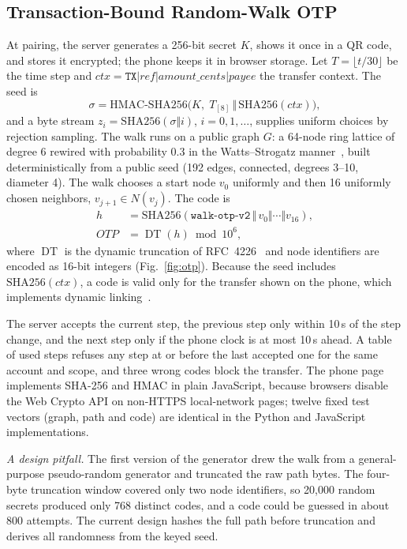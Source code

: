 \documentclass{ieeeaccess}
\begin{document}
\subsection{Transaction-Bound Random-Walk OTP}
\label{sec:otp}
At pairing, the server generates a 256-bit secret $K$, shows it once in a QR code, and stores it
encrypted; the phone keeps it in browser storage. Let $T=\lfloor t/30\rfloor$ be the time step and
$\mathit{ctx}=\texttt{TX}|\mathit{ref}|\mathit{amount\_cents}|\mathit{payee}$ the transfer context. The
seed is
\begin{equation}
\sigma=\text{HMAC-SHA256}\big(K,\;T_{[8]}\,\Vert\,\text{SHA256}(\mathit{ctx})\big),
\end{equation}
and a byte stream $z_i=\text{SHA256}(\sigma\Vert i)$, $i=0,1,\dots$, supplies uniform choices by
rejection sampling. The walk runs on a public graph $G$: a 64-node ring lattice of degree 6 rewired with
probability 0.3 in the Watts--Strogatz manner~\cite{watts1998}, built deterministically from a public
seed (192 edges, connected, degrees 3--10, diameter 4). The walk chooses a start node $v_0$ uniformly
and then 16 uniformly chosen neighbors, $v_{j+1}\in N(v_j)$. The code is
\begin{equation}
\begin{split}
h&=\text{SHA256}(\texttt{walk-otp-v2}\,\Vert\,v_0\Vert\cdots\Vert v_{16}),\\
\mathit{OTP}&=\operatorname{DT}(h)\bmod 10^6,
\end{split}
\end{equation}
where $\operatorname{DT}$ is the dynamic truncation of RFC~4226~\cite{rfc4226} and node identifiers are
encoded as 16-bit integers (Fig.~\ref{fig:otp}). Because the seed includes $\mathrm{SHA256}(\mathit{ctx})$,
a code is valid only for the transfer shown on the phone, which implements dynamic
linking~\cite{psd2rts}.

The server accepts the current step, the previous step only within 10\,s of the step change, and the
next step only if the phone clock is at most 10\,s ahead. A table of used steps refuses any step at or
before the last accepted one for the same account and scope, and three wrong codes block the transfer.
The phone page implements SHA-256 and HMAC in plain JavaScript, because browsers disable the Web Crypto
API on non-HTTPS local-network pages; twelve fixed test vectors (graph, path and code) are identical in
the Python and JavaScript implementations.

\emph{A design pitfall.} The first version of the generator drew the walk from a general-purpose
pseudo-random generator and truncated the raw path bytes. The four-byte truncation window covered only
two node identifiers, so 20,000 random secrets produced only 768 distinct codes, and a code could be
guessed in about 800 attempts. The current design hashes the full path before truncation and derives all
randomness from the keyed seed.
\end{document}
